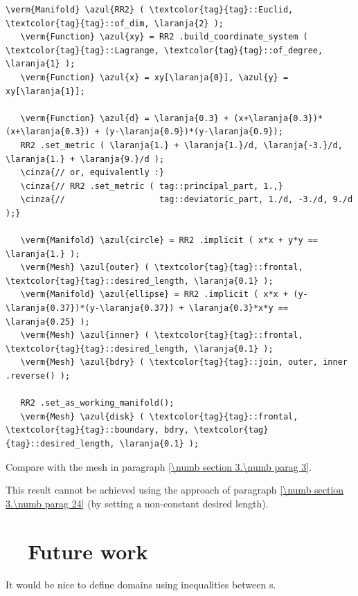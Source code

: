 \begin{Verbatim}[commandchars=\\\{\},formatcom=\small\tt,frame=single,
   label=code not working,rulecolor=\color{moldura},
   baselinestretch=0.94,framesep=2mm                                  ]
   \verm{Manifold} \azul{RR2} ( \textcolor{tag}{tag}::Euclid, \textcolor{tag}{tag}::of_dim, \laranja{2} );
   \verm{Function} \azul{xy} = RR2 .build_coordinate_system ( \textcolor{tag}{tag}::Lagrange, \textcolor{tag}{tag}::of_degree, \laranja{1} );
   \verm{Function} \azul{x} = xy[\laranja{0}], \azul{y} = xy[\laranja{1}];

   \verm{Function} \azul{d} = \laranja{0.3} + (x+\laranja{0.3})*(x+\laranja{0.3}) + (y-\laranja{0.9})*(y-\laranja{0.9});
   RR2 .set_metric ( \laranja{1.} + \laranja{1.}/d, \laranja{-3.}/d, \laranja{1.} + \laranja{9.}/d );
   \cinza{// or, equivalently :}
   \cinza{// RR2 .set_metric ( tag::principal_part, 1.,}
   \cinza{//                   tag::deviatoric_part, 1./d, -3./d, 9./d );}

   \verm{Manifold} \azul{circle} = RR2 .implicit ( x*x + y*y == \laranja{1.} );
   \verm{Mesh} \azul{outer} ( \textcolor{tag}{tag}::frontal, \textcolor{tag}{tag}::desired_length, \laranja{0.1} );
   \verm{Manifold} \azul{ellipse} = RR2 .implicit ( x*x + (y-\laranja{0.37})*(y-\laranja{0.37}) + \laranja{0.3}*x*y == \laranja{0.25} );
   \verm{Mesh} \azul{inner} ( \textcolor{tag}{tag}::frontal, \textcolor{tag}{tag}::desired_length, \laranja{0.1} );
   \verm{Mesh} \azul{bdry} ( \textcolor{tag}{tag}::join, outer, inner .reverse() );

   RR2 .set_as_working_manifold();
   \verm{Mesh} \azul{disk} ( \textcolor{tag}{tag}::frontal, \textcolor{tag}{tag}::boundary, bdry, \textcolor{tag}{tag}::desired_length, \laranja{0.1} );
\end{Verbatim}

Compare with the mesh in paragraph \ref{\numb section 3.\numb parag 3}.

This result cannot be achieved using the approach of paragraph
\ref{\numb section 3.\numb parag 24} (by setting a non-constant desired length).


\section{~~Future work}\label{\numb section 3.\numb parag 27}

It would be nice to define domains using inequalities between {\small\tt{}}s.

